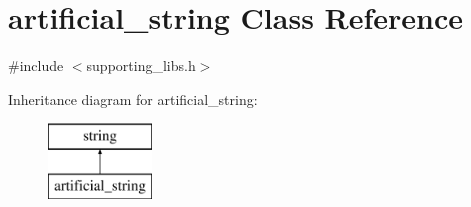 \hypertarget{classartificial__string}{}\section{artificial\+\_\+string Class Reference}
\label{classartificial__string}


{\ttfamily \#include $<$supporting\+\_\+libs.\+h$>$}

Inheritance diagram for artificial\+\_\+string\+:\begin{figure}[H]
\begin{center}
\leavevmode
\includegraphics[height=2.000000cm]{classartificial__string}
\end{center}
\end{figure}
